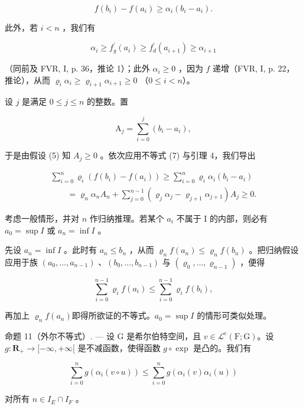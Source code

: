 \[
f (b _ {i}) - f (a _ {i}) \geqslant \alpha_ {i} (b _ {i} - a _ {i}).\tag{7}
\]

此外，若 \(i < n\) ，我们有

\[
\alpha_ {i} \geqslant f _ {g} ^ {\prime} (a _ {i}) \geqslant f _ {d} ^ {\prime} (a _ {i + 1}) \geqslant \alpha_ {i + 1}
\]

（同前及 FVR, I, p. 36，推论 1）；此外 \(\alpha_{i} \geqslant 0\) ，因为 \(f\) 递增（FVR, I, p. 22，推论），从而 \(\varrho_{i}\alpha_{i} \geqslant \varrho_{i+1}\alpha_{i+1} \geqslant 0\) （\(0 \leqslant i < n\)）。

设 \(j\) 是满足 \(0 \leqslant j \leqslant n\) 的整数。置

\[
\mathrm{A} _ {j} = \sum_ {i = 0} ^ {j} (b _ {i} - a _ {i}),
\]

于是由假设 (5) 知 \(A_{j} \geqslant 0\) 。依次应用不等式 (7) 与引理 4，我们导出

\[
\begin{array}{l} \sum_ {i = 0} ^ {n} \varrho_ {i} (f (b _ {i}) - f (a _ {i})) \geqslant \sum_ {i = 0} ^ {n} \varrho_ {i} \alpha_ {i} (b _ {i} - a _ {i}) \\ \qquad = \varrho_ {n} \alpha_ {n} A _ {n} + \sum_ {j = 0} ^ {n - 1} (\varrho_ {j} \alpha_ {j} - \varrho_ {j + 1} \alpha_ {j + 1}) A _ {j} \geqslant 0. \end{array}
\]

考虑一般情形，并对 \(n\) 作归纳推理。若某个 \(a_{i}\) 不属于 I 的内部，则必有 \(a_{0} = \sup I\) 或 \(a_{n} = \inf I\) 。

先设 \(a_{n}=\inf I\) 。此时有 \(a_{n}\leqslant b_{n}\) ，从而 \(\varrho_{n}f(a_{n})\leqslant\varrho_{n}f(b_{n})\) 。把归纳假设应用于族 \((a_{0},\ldots,a_{n-1})\) 、\((b_{0},\ldots,b_{n-1})\) 与 \((\varrho_{0},\ldots,\varrho_{n-1})\) ，便得

\[
\sum_ {i = 0} ^ {n - 1} \varrho_ {i} f (a _ {i}) \leqslant \sum_ {i = 0} ^ {n - 1} \varrho_ {i} f (b _ {i}),
\]

再加上 \(\varrho_{n}f(a_{n})\)即得所欲证的不等式。\(a_{0} = \sup I\) 的情形可类似处理。

命题 11（外尔不等式）. --- 设 G 是希尔伯特空间，且 \(v \in \mathcal{L}^{\mathrm{c}}(\mathrm{F};\mathrm{G})\)。设 \(g: \mathbf{R}_{+} \to [-\infty, +\infty[\) 是不减函数，使得函数 \(g \circ \exp\) 是凸的。我们有

\[
\sum_ {i = 0} ^ {n} g \left(\alpha_ {i} (v \circ u)\right) \leqslant \sum_ {i = 0} ^ {n} g \left(\alpha_ {i} (v) \alpha_ {i} (u)\right)
\]

对所有 \(n \in I_{E} \cap I_{F}\) 。

